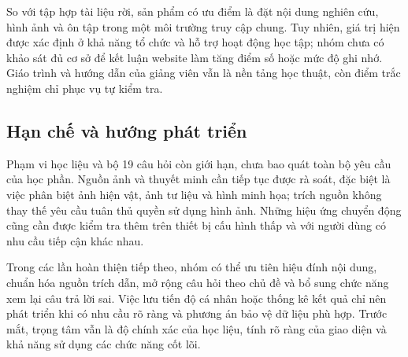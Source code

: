 So với tập hợp tài liệu rời, sản phẩm có ưu điểm là đặt nội dung nghiên cứu, hình ảnh và ôn tập trong một môi trường truy cập chung. Tuy nhiên, giá trị hiện được xác định ở khả năng tổ chức và hỗ trợ hoạt động học tập; nhóm chưa có khảo sát đủ cơ sở để kết luận website làm tăng điểm số hoặc mức độ ghi nhớ. Giáo trình và hướng dẫn của giảng viên vẫn là nền tảng học thuật, còn điểm trắc nghiệm chỉ phục vụ tự kiểm tra.

\subsection{Hạn chế và hướng phát triển}

Phạm vi học liệu và bộ 19 câu hỏi còn giới hạn, chưa bao quát toàn bộ yêu cầu của học phần. Nguồn ảnh và thuyết minh cần tiếp tục được rà soát, đặc biệt là việc phân biệt ảnh hiện vật, ảnh tư liệu và hình minh họa; trích nguồn không thay thế yêu cầu tuân thủ quyền sử dụng hình ảnh. Những hiệu ứng chuyển động cũng cần được kiểm tra thêm trên thiết bị cấu hình thấp và với người dùng có nhu cầu tiếp cận khác nhau.

Trong các lần hoàn thiện tiếp theo, nhóm có thể ưu tiên hiệu đính nội dung, chuẩn hóa nguồn trích dẫn, mở rộng câu hỏi theo chủ đề và bổ sung chức năng xem lại câu trả lời sai. Việc lưu tiến độ cá nhân hoặc thống kê kết quả chỉ nên phát triển khi có nhu cầu rõ ràng và phương án bảo vệ dữ liệu phù hợp. Trước mắt, trọng tâm vẫn là độ chính xác của học liệu, tính rõ ràng của giao diện và khả năng sử dụng các chức năng cốt lõi.

\clearpage
